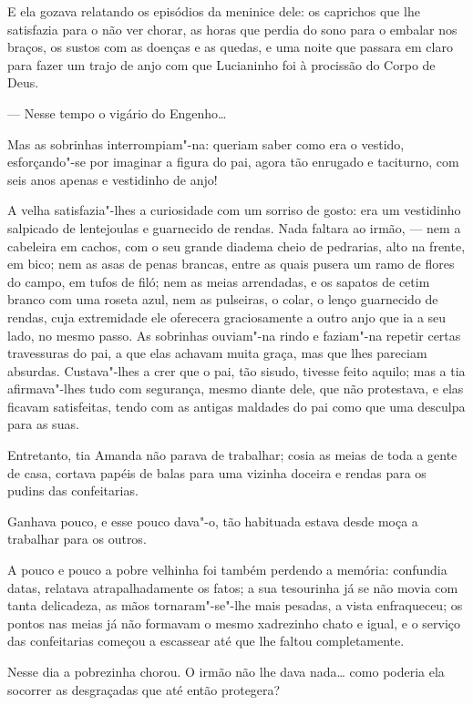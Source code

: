 E ela gozava relatando os episódios da meninice dele: os caprichos que
lhe satisfazia para o não ver chorar, as horas que perdia do sono para o
embalar nos braços, os sustos com as doenças e as quedas, e uma noite
que passara em claro para fazer um trajo de anjo com que Lucianinho foi
à procissão do Corpo de Deus.

--- Nesse tempo o vigário do Engenho\ldots{}

Mas as sobrinhas interrompiam"-na: queriam saber como era o vestido,
esforçando"-se por imaginar a figura do pai, agora tão enrugado e
taciturno, com seis anos apenas e vestidinho de anjo!

A velha satisfazia"-lhes a curiosidade com um sorriso de gosto: era um
vestidinho salpicado de lentejoulas e guarnecido de rendas. Nada faltara
ao irmão, --- nem a cabeleira em cachos, com o seu grande diadema cheio
de pedrarias, alto na frente, em bico; nem as asas de penas brancas,
entre as quais pusera um ramo de flores do campo, em tufos de filó; nem
as meias arrendadas, e os sapatos de cetim branco com uma roseta azul,
nem as pulseiras, o colar, o lenço guarnecido de rendas, cuja
extremidade ele oferecera graciosamente a outro anjo que ia a seu lado,
no mesmo passo. As sobrinhas ouviam"-na rindo e faziam"-na repetir certas
travessuras do pai, a que elas achavam muita graça, mas que lhes
pareciam absurdas. Custava"-lhes a crer que o pai, tão sisudo, tivesse
feito aquilo; mas a tia afirmava"-lhes tudo com segurança, mesmo diante
dele, que não protestava, e elas ficavam satisfeitas, tendo com as
antigas maldades do pai como que uma desculpa para as suas.

Entretanto, tia Amanda não parava de trabalhar; cosia as meias de toda a
gente de casa, cortava papéis de balas para uma vizinha doceira e rendas
para os pudins das confeitarias.

Ganhava pouco, e esse pouco dava"-o, tão habituada estava desde moça a
trabalhar para os outros.

A pouco e pouco a pobre velhinha foi também perdendo a memória:
confundia datas, relatava atrapalhadamente os fatos; a sua tesourinha já
se não movia com tanta delicadeza, as mãos tornaram"-se"-lhe mais pesadas,
a vista enfraqueceu; os pontos nas meias já não formavam o mesmo
xadrezinho chato e igual, e o serviço das confeitarias começou a
escassear até que lhe faltou completamente.

Nesse dia a pobrezinha chorou. O irmão não lhe dava nada\ldots{} como poderia
ela socorrer as desgraçadas que até então protegera?


